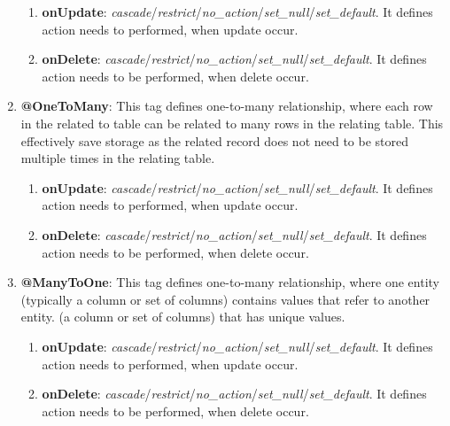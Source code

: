 \begin{enumerate}
		\begin{enumerate}

			\item \small \textbf{onUpdate}: \textit{cascade}/\textit{restrict}/\textit{no\_action}/\textit{set\_null}/\textit{set\_default}. It defines action needs to performed, when update occur. 
			\item \small \textbf{onDelete}: \textit{cascade}/\textit{restrict}/\textit{no\_action}/\textit{set\_null}/\textit{set\_default}. It defines action needs to be performed, when delete occur.		

		\end{enumerate}


	\item \small \textbf{@OneToMany}: This tag defines one-to-many relationship, where each row in the related to table can be related to many rows in the relating table. This effectively save storage as the related record does not need to be stored multiple times in the relating table.
	
		\begin{enumerate}

			\item \small \textbf{onUpdate}: \textit{cascade}/\textit{restrict}/\textit{no\_action}/\textit{set\_null}/\textit{set\_default}. It defines action needs to performed, when update occur. 
			\item \small \textbf{onDelete}: \textit{cascade}/\textit{restrict}/\textit{no\_action}/\textit{set\_null}/\textit{set\_default}. It defines action needs to be performed, when delete occur.		

		\end{enumerate}

	\item \small \textbf{@ManyToOne}: This tag defines one-to-many relationship, where one entity (typically a column or set of columns) contains values that refer to another entity. (a column or set of columns) that has unique values.
	

		\begin{enumerate}

			\item \small \textbf{onUpdate}: \textit{cascade}/\textit{restrict}/\textit{no\_action}/\textit{set\_null}/\textit{set\_default}. It defines action needs to performed, when update occur. 
			\item \small \textbf{onDelete}: \textit{cascade}/\textit{restrict}/\textit{no\_action}/\textit{set\_null}/\textit{set\_default}. It defines action needs to be performed, when delete occur.		


\end{enumerate}
\end{enumerate}
